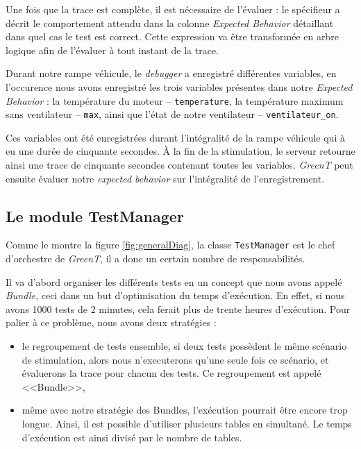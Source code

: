 Une fois que la trace est complète, il est nécessaire de l'évaluer : le spécifieur a décrit le comportement attendu dans la colonne \textit{Expected Behavior} détaillant dans quel cas le test est correct. Cette expression va être transformée en arbre logique afin de l'évaluer à tout instant de la trace. 

\begin{exemple}
	Durant notre rampe véhicule, le \textit{debugger} a enregistré différentes variables, en l'occurence nous avons enregistré les trois variables présentes dans notre \textit{Expected Behavior} : la température	du moteur -- \texttt{temperature}, la température maximum sans ventilateur -- \texttt{max}, ainsi que l'état de notre ventilateur -- \texttt{ventilateur\_on}.
	
	Ces variables ont été enregistrées durant l'intégralité de la rampe véhicule qui à eu une durée de cinquante secondes. À la fin de la stimulation, le serveur retourne ainsi une trace de cinquante secondes contenant toutes les variables. \textit{GreenT} peut ensuite évaluer notre \textit{expected behavior} sur l'intégralité de l'enregistrement.
\end{exemple}

\subsection{Le module TestManager}\label{testManager}
Comme le montre la figure \ref{fig:generalDiag}, la classe \texttt{TestManager} est le chef d'orchestre de \textit{GreenT}, il a donc un certain nombre de responsabilités. 

Il va d'abord organiser les différents tests en un concept que nous avons appelé \textit{Bundle}, ceci dans un but d'optimisation du temps d'exécution. En effet, si nous avons 1000 tests de 2 minutes, cela ferait plus de trente heures d'exécution. Pour palier à ce problème, nous avons deux stratégies :
\begin{itemize}
	\item le regroupement de tests ensemble, si deux tests possèdent le même scénario de stimulation, alors nous n'executerons qu'une seule fois ce scénario, et évaluerons la trace pour chacun des tests. Ce regroupement est appelé <<Bundle>>,
	\item même avec notre stratégie des Bundles, l'exécution pourrait être encore trop longue. Ainsi, il est possible d'utiliser plusieurs tables en simultané. Le temps d'exécution est ainsi divisé par le nombre de tables.
\end{itemize}

